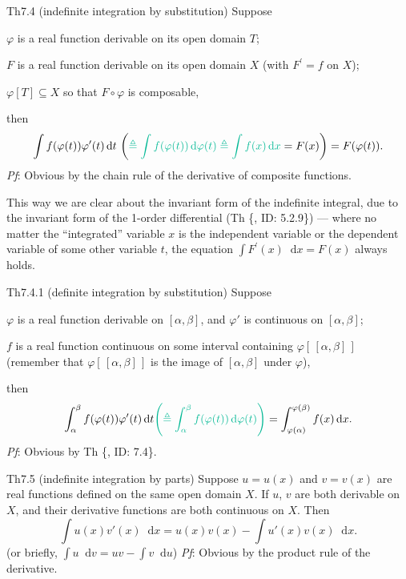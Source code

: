 \documentclass{article}
\newcommand{\dif}{\mathop{}\!\mathrm{d}}
\begin{document}
\begin{Th}{Th7.4 (indefinite integration by substitution)}
    Suppose
    \begin{compactenum}
        \item $\varphi$ is a real function derivable on its open domain $T$;
        \item $F$ is a real function derivable on its open domain $X$ (with $F^\prime = f$ on $X$);
        \item $\varphi[T]\subseteq X$ so that $F\circ\varphi$ is composable,
    \end{compactenum}
    then
    $$\int f(\varphi(t))\varphi'(t)\dif t\, \left(\textcolor{Df}{ \triangleq \int f(\varphi(t))\dif \varphi(t) \triangleq \int f(x)\dif x} = F(x)\right) = F(\varphi(t)). $$
    \tcblower
    \textit{Pf}: Obvious by the chain rule of the derivative of composite functions.
\end{Th}

\begin{Rmk}{}
    This way we are clear about the invariant form of the indefinite integral, due to the invariant form of the 1-order differential (Th \{, ID: 5.2.9\}) — where no matter the ``integrated'' variable $x$ is the independent variable or the dependent variable of some other variable $t$, the equation $\int F^\prime(x)\dif x = F(x)$ always holds.
\end{Rmk}

\begin{Th}{Th7.4.1 (definite integration by substitution)}
    Suppose
    \begin{compactenum}
        \item $\varphi$ is a real function derivable on $[\alpha, \beta]$, and $\varphi'$ is continuous on $[\alpha, \beta]$;
        \item $f$ is a real function continuous on some interval containing $\varphi[\,[\alpha, \beta]\,]$ (remember that $\varphi[\,[\alpha, \beta]\,]$ is the image of $[\alpha, \beta]$ under $\varphi$),
    \end{compactenum}
    then
    $$\int_{\alpha}^{\beta} f(\varphi(t))\varphi'(t)\dif t \textcolor{Df}{\left(\triangleq \int_{\alpha}^{\beta} f(\varphi(t)) \dif \varphi(t) \right)} = \int_{\varphi(\alpha)}^{\varphi(\beta)} f(x)\dif x.$$
    \tcblower
    \textit{Pf}: Obvious by Th \{, ID: 7.4\}.
\end{Th}

\begin{Th}{Th7.5 (indefinite integration by parts)}
    Suppose $u = u(x)$ and $v = v(x)$ are real functions defined on the same open domain $X$. If $u$, $v$ are both derivable on $X$, and their derivative functions are both continuous on $X$. Then
    $$\int u(x)v'(x)\dif x = u(x)v(x) - \int u'(x)v(x)\dif x.$$
    (or briefly, $\int u\dif v = uv - \int v\dif u$)
    \tcblower
    \textit{Pf}: Obvious by the product rule of the derivative.
\end{Th}
\end{document}

